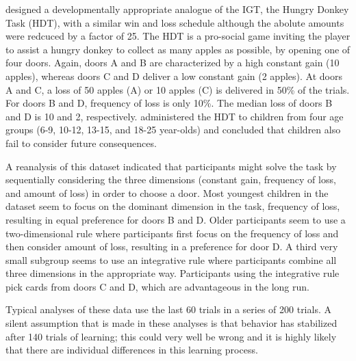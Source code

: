 \documentclass[a4paper,12pt,man]{apa} %
\begin{document}
\cite{Crone2004} designed a developmentally appropriate analogue of
the IGT, the Hungry Donkey Task (HDT), with a similar win and loss
schedule although the abolute amounts were redcuced by a factor of 25.
The HDT is a pro-social game inviting the player to assist a hungry
donkey to collect as many apples as possible, by opening one of four
doors.  Again, doors A and B are characterized by a high constant gain
(10 apples), whereas doors C and D deliver a low constant gain (2
apples).  At doors A and C, a loss of 50 apples (A) or 10 apples (C)
is delivered in 50\% of the trials.  For doors B and D, frequency of
loss is only 10\%.  The median loss of doors B and D is 10 and 2,
respectively.  \cite{Crone2004} administered the HDT to children from
four age groups (6-9, 10-12, 13-15, and 18-25 year-olds) and concluded
that children also fail to consider future consequences.

A reanalysis of this dataset \cite{Huizenga2007} indicated that
participants might solve the task by sequentially considering the
three dimensions (constant gain, frequency of loss, and amount of
loss) in order to choose a door.  Most youngest children in the
dataset seem to focus on the dominant dimension in the task, frequency
of loss, resulting in equal preference for doors B and D. Older
participants seem to use a two-dimensional rule where participants
first focus on the frequency of loss and then consider amount of loss,
resulting in a preference for door D. A third very small subgroup
seems to use an integrative rule where participants combine all three
dimensions in the appropriate way.  Participants using the integrative
rule pick cards from doors C and D, which are advantageous in the long
run.

Typical analyses of these data use the last 60 trials in a series of
200 trials.  A silent assumption that is made in these analyses is
that behavior has stabilized after 140 trials of learning; this could
very well be wrong and it is highly likely that there are individual
differences in this learning process.
\end{document}

